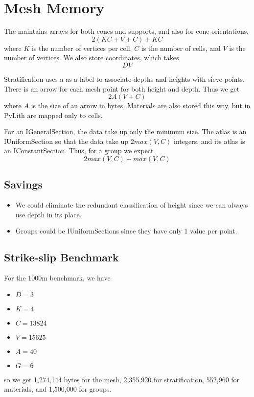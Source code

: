 \section{Mesh Memory}

    The  maintains arrays for both cones and supports, and also for cone orientations.
$$
  2 (K C + V+C) + K C
$$
where $K$ is the number of vertices per cell, $C$ is the number of cells, and $V$ is the number of vertices. We also
store coordinates, which takes
$$
  D V
$$

    Stratification uses a  as a label to associate depths and heights with sieve points. There is an arrow
for each mesh point for both height and depth. Thus we get
$$
  2 A (V + C)
$$
where $A$ is the size of an arrow in bytes. Materials are also stored this way, but in PyLith are mapped only to cells.

    For an IGeneralSection, the data take up only the minimum size. The atlas is an IUniformSection so that the data
take up $2 max(V, C)$ integers, and its atlas is an IConstantSection. Thus, for a group we expect
$$
  2 max(V, C) + max(V, C)
$$

\subsection{Savings}

\begin{itemize}
  \item We could eliminate the redundant classification of height since we can always use depth in its place.

  \item Groups could be IUniformSections since they have only 1 value per point.
\end{itemize}

\subsection{Strike-slip Benchmark}
    For the 1000m benchmark, we have
\begin{itemize}
  \item $D = 3$
  \item $K = 4$
  \item $C = 13824$
  \item $V = 15625$
  \item $A = 40$
  \item $G = 6$
\end{itemize}
so we get 1,274,144 bytes for the mesh, 2,355,920 for stratification, 552,960 for materials, and 1,500,000 for groups.